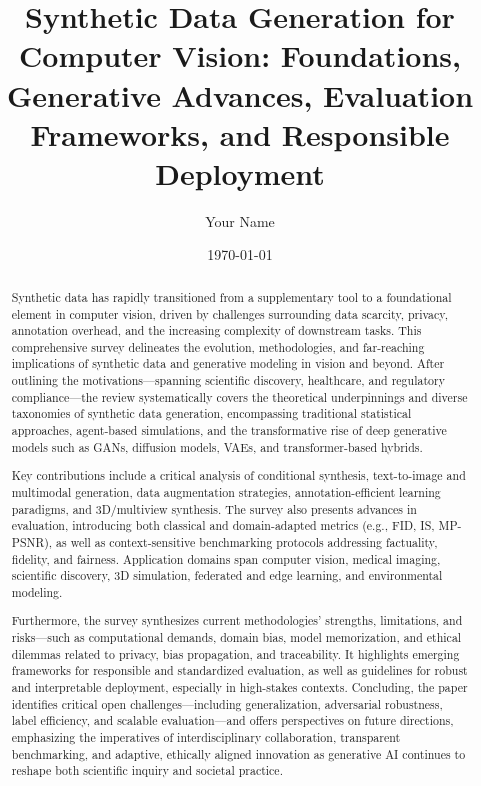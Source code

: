 \documentclass[11pt]{article}
\begin{document}
\author{Your Name}
\date{\today}

\title{\title{Synthetic Data Generation for Computer Vision: Foundations, Generative Advances, Evaluation Frameworks, and Responsible Deployment}}
\maketitle

\begin{abstract}

Synthetic data has rapidly transitioned from a supplementary tool to a foundational element in computer vision, driven by challenges surrounding data scarcity, privacy, annotation overhead, and the increasing complexity of downstream tasks. This comprehensive survey delineates the evolution, methodologies, and far-reaching implications of synthetic data and generative modeling in vision and beyond. After outlining the motivations—spanning scientific discovery, healthcare, and regulatory compliance—the review systematically covers the theoretical underpinnings and diverse taxonomies of synthetic data generation, encompassing traditional statistical approaches, agent-based simulations, and the transformative rise of deep generative models such as GANs, diffusion models, VAEs, and transformer-based hybrids. 

Key contributions include a critical analysis of conditional synthesis, text-to-image and multimodal generation, data augmentation strategies, annotation-efficient learning paradigms, and 3D/multiview synthesis. The survey also presents advances in evaluation, introducing both classical and domain-adapted metrics (e.g., FID, IS, MP-PSNR), as well as context-sensitive benchmarking protocols addressing factuality, fidelity, and fairness. Application domains span computer vision, medical imaging, scientific discovery, 3D simulation, federated and edge learning, and environmental modeling.

Furthermore, the survey synthesizes current methodologies’ strengths, limitations, and risks—such as computational demands, domain bias, model memorization, and ethical dilemmas related to privacy, bias propagation, and traceability. It highlights emerging frameworks for responsible and standardized evaluation, as well as guidelines for robust and interpretable deployment, especially in high-stakes contexts. Concluding, the paper identifies critical open challenges—including generalization, adversarial robustness, label efficiency, and scalable evaluation—and offers perspectives on future directions, emphasizing the imperatives of interdisciplinary collaboration, transparent benchmarking, and adaptive, ethically aligned innovation as generative AI continues to reshape both scientific inquiry and societal practice.
\end{abstract}
\end{document}
